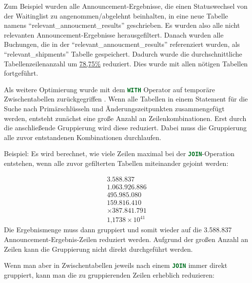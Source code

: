 Zum Beispiel wurden alle Announcement-Ergebnisse, die einen Statuswechsel von der Waitinglist zu angenommen/abgelehnt beinhalten, in eine neue Tabelle namens \enquote{relevant\_annoucment\_results} geschrieben. 
Es wurden also alle nicht relevanten Announcement-Ergebnisse herausgefiltert. 
Danach wurden alle Buchungen, die in der \enquote{relevant\_annoucment\_results} referenziert wurden, als \enquote{relevant\_shipments} Tabelle gespeichert. 
Dadurch wurde die durchschnittliche Tabellenzeilenanzahl um \hyperref[tab:tab_sizes_diff]{78,75\%} reduziert. 
Dies wurde mit allen nötigen Tabellen fortgeführt.

Als weitere Optimierung wurde mit dem \lstinline[language=SQL]|WITH| Operator auf temporäre Zwischentabellen zurückgegriffen \cite{Horvat2008}. Wenn alle Tabellen in einem Statement für die Suche nach Primärschlüsseln und Änderungszeitpunkten zusammengefügt werden, entsteht zunächst eine große Anzahl an Zeilenkombinationen. Erst durch die anschließende Gruppierung wird diese reduziert.
Dabei muss die Gruppierung alle zuvor entstandenen Kombinationen durchlaufen.

Beispiel:
Es wird berechnet, wie viele Zeilen maximal bei der \lstinline[language=SQL]|JOIN|-Operation entstehen, wenn alle zuvor gefilterten Tabellen miteinander gejoint werden:

\[
\begin{array}{r}
   3.588.837 \\
   1.063.926.886 \\
   495.985.080 \\
   159.816.410 \\
\times 387.841.791 \\
    \hline
   1\text{,}1738 \times 10^{41}
\end{array}
\]
Die Ergebnismenge muss dann gruppiert und somit wieder auf die 3.588.837 Announcement-Ergebnis-Zeilen reduziert werden. Aufgrund der großen Anzahl an Zeilen kann die Gruppierung nicht direkt durchgeführt werden.


Wenn man aber in Zwischentabellen jeweils nach einem \lstinline[language=SQL]|JOIN| immer direkt gruppiert, kann man die zu gruppierenden Zeilen erheblich reduzieren:

